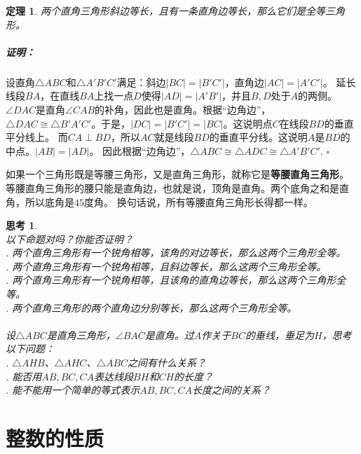 \documentclass[12pt,UTF8]{ctexbook}
\newtheorem{tm}{定理}[section]
\newtheorem{sk}{思考}[section]
\newenvironment{proof2}{\paragraph{\textbf{证明：}}}{\hfill$\square$}
\begin{document}
\begin{tm}\label{tm:4-1-1}
    两个直角三角形斜边等长，且有一条直角边等长，那么它们是全等三角形。
\end{tm}
\begin{proof2}
    设直角$\triangle ABC$和$\triangle A'B'C'$满足：斜边$|BC| = |B'C'|$，直角边$|AC| = |A'C'|$。
    延长线段$BA$，在直线$BA$上找一点$D$使得$|AD| = |A'B'|$，并且$B,D$处于$A$的两侧。
    $\angle DAC$是直角$\angle CAB$的补角，因此也是直角。根据“边角边”，
    $\triangle DAC \cong \triangle B'A'C'$。于是，$|DC| = |B'C'| = |BC|$。这说明点$C$在线段$BD$的垂直平分线上。
    而$CA \perp BD$，所以$AC$就是线段$BD$的垂直平分线。这说明$A$是$BD$的中点。$|AB| = |AD|$。
    因此根据“边角边”，$\triangle ABC \cong \triangle ADC \cong \triangle A'B'C'.$
\end{proof2}

如果一个三角形既是等腰三角形，又是直角三角形，就称它是\textbf{等腰直角三角形}。
等腰直角三角形的腰只能是直角边，也就是说，顶角是直角。两个底角之和是直角，所以底角是$45$度角。
换句话说，所有等腰直角三角形长得都一样。

\begin{sk}\label{sk:4-1-0}
    \mbox{}\\
    以下命题对吗？你能否证明？\\
    . 两个直角三角形有一个锐角相等，该角的对边等长，那么这两个三角形全等。\\
    . 两个直角三角形有一个锐角相等，且斜边等长，那么这两个三角形全等。\\
    . 两个直角三角形有一个锐角相等，且该角的直角边等长，那么这两个三角形全等。\\
    . 两个直角三角形的两个直角边分别等长，那么这两个三角形全等。\\
    \vspace{2pt}\\
    设$\triangle ABC$是直角三角形，$\angle BAC$是直角。过$A$作关于$BC$的垂线，垂足为$H$，思考以下问题：\\
    . $\triangle AHB$、$\triangle AHC$、$\triangle ABC$之间有什么关系？\\
    . 能否用$AB, BC, CA$表达线段$BH$和$CH$的长度？\\
    . 能不能用一个简单的等式表示$AB, BC, CA$长度之间的关系？
\end{sk}


\chapter{整数的性质}
\end{document}
